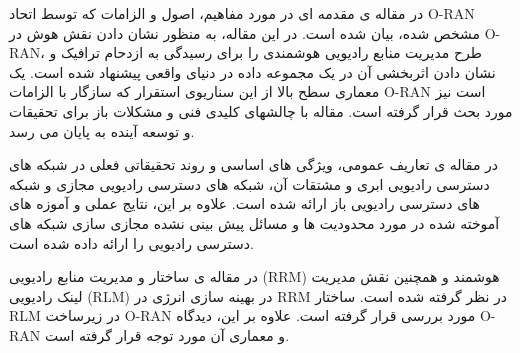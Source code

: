 در مقاله ی 
\cite{oranInt}
 مقدمه ای در مورد مفاهیم، اصول و الزامات  که توسط اتحاد O-RAN مشخص شده، بیان شده است.
 در این مقاله،
 به منظور نشان دادن نقش هوش در O-RAN، طرح مدیریت منابع رادیویی هوشمندی را برای رسیدگی به ازدحام ترافیک و نشان دادن اثربخشی آن در یک مجموعه داده در دنیای واقعی پیشنهاد شده است.
 یک معماری سطح بالا از این سناریوی استقرار که سازگار با الزامات O-RAN است نیز مورد بحث قرار گرفته است. مقاله با چالشهای کلیدی فنی و مشکلات باز برای تحقیقات و توسعه آینده به پایان می رسد.
 
در مقاله ی
\cite{c2o}
تعاریف عمومی، ویژگی های اساسی و روند تحقیقاتی فعلی در شبکه های دسترسی رادیویی ابری و مشتقات آن، شبکه های دسترسی رادیویی مجازی و شبکه های دسترسی رادیویی باز ارائه شده است.
علاوه بر این، نتایج عملی و آموزه های آموخته شده در مورد محدودیت ها و مسائل پیش بینی نشده مجازی سازی شبکه های دسترسی رادیویی را ارائه داده شده است.


در مقاله ی 
\cite{sree2019open, kawahara2019ran}
 ساختار و مدیریت منابع رادیویی (RRM) هوشمند 
 و همچنین نقش مدیریت لینک رادیویی (RLM) در بهینه سازی انرژی در RRM
در نظر گرفته شده است.
ساختار RLM در 
زیرساخت O-RAN مورد بررسی قرار گرفته است.
علاوه بر این، دیدگاه
O-RAN
 و معماری آن مورد توجه قرار گرفته است.